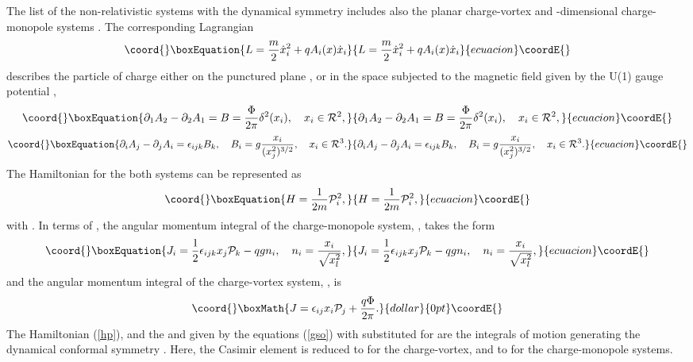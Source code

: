\documentclass[a4paper,12pt]{article}
\begin{document}
The list of the non-relativistic
systems with the dynamical \coordHE{} symmetry
includes also the
planar charge-vortex \cite{Jackv} and \coordHE{}-dimensional
charge-monopole systems \cite{Jackm,mp}.
The corresponding Lagrangian
\begin{equation}\coord{}\boxEquation{
L=\frac{m}{2}\dot x_i^2+qA_i(x)\dot x_i
\label{vormon}
}{
L=\frac{m}{2}\dot x_i^2+qA_i(x)\dot x_i
}{ecuacion}\coordE{}\end{equation}
describes the particle of charge \coordHE{}
either
on the punctured plane
\coordHE{}, or in the space
\coordHE{}
subjected to the magnetic field
given by  the U(1) gauge potential
\coordHE{},
\begin{equation}\coord{}\boxEquation{
\partial_1 A_2-\partial_2 A_1=B=
\frac{\Phi}{2\pi}\delta^{2}(x_i),\quad
x_i\in{\cal R}^2,
\label{avor}
}{
\partial_1 A_2-\partial_2 A_1=B=
\frac{\Phi}{2\pi}\delta^{2}(x_i),\quad
x_i\in{\cal R}^2,
}{ecuacion}\coordE{}\end{equation}
\begin{equation}\coord{}\boxEquation{
\partial_i A_j-\partial_j A_i=\epsilon_{ijk}B_k,\quad
B_i=g\frac{x_i}{(x_j^2)^{3/2}},\quad
x_i\in {\cal R}^3.
\label{amon}
}{
\partial_i A_j-\partial_j A_i=\epsilon_{ijk}B_k,\quad
B_i=g\frac{x_i}{(x_j^2)^{3/2}},\quad
x_i\in {\cal R}^3.
}{ecuacion}\coordE{}\end{equation}
The Hamiltonian for the both systems
can be represented as
\begin{equation}\coord{}\boxEquation{
H=\frac{1}{2m}{\cal P}_i^2,
\label{hp}
}{
H=\frac{1}{2m}{\cal P}_i^2,
}{ecuacion}\coordE{}\end{equation}
with
\coordHE{}.
In terms of \coordHE{},
the angular momentum integral
of the charge-monopole system,
\coordHE{},
takes the form
\begin{equation}\coord{}\boxEquation{
J_i=\frac{1}{2}\epsilon_{ijk}x_j{\cal P}_k-
qg n_i,\quad n_i=\frac{x_i}{\sqrt{x_l^2}},
\label{jmono}
}{
J_i=\frac{1}{2}\epsilon_{ijk}x_j{\cal P}_k-
qg n_i,\quad n_i=\frac{x_i}{\sqrt{x_l^2}},
}{ecuacion}\coordE{}\end{equation}
and the angular momentum integral of the
charge-vortex system,
\coordHE{},
is
$$\coord{}\boxMath{
J=\epsilon_{ij}x_i{\cal P}_j
+\frac{q\Phi}{2\pi}.
}{dollar}{0pt}\coordE{}$$
The Hamiltonian (\ref{hp}), and the \coordHE{} and \coordHE{} given by the
equations
(\ref{gso}) with \coordHE{} substituted for
\coordHE{}
are the integrals of motion
generating the dynamical
conformal symmetry \coordHE{}.
Here, the Casimir element is reduced to
\coordHE{}
for the charge-vortex, and to
\coordHE{}
for the charge-monopole systems.
\end{document}
